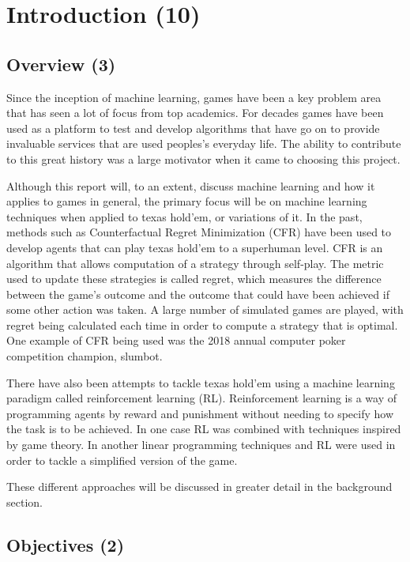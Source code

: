 \chapter{Introduction (10)}
\label{ch:intro}

\section{Overview (3)}\label{sec:overview}
Since the inception of machine learning, games have been a key problem area that has seen a lot of focus from
top academics.
For decades games have been used as a platform to test and develop algorithms that have go on to provide invaluable
services that are used peoples's everyday life.
The ability to contribute to this great history was a large motivator when it came to choosing this project.

Although this report will, to an extent, discuss machine learning and how it applies to games in general, the
primary focus will be on machine learning techniques when applied to texas hold'em, or variations of it.
In the past, methods such as Counterfactual Regret Minimization (CFR) have been used to develop agents that can
play texas hold'em to a superhuman level.
CFR is an algorithm that allows computation of a strategy through self-play.
The metric used to update these strategies is called regret, which measures the difference between the
game's outcome and the outcome that could have been achieved if some other action was taken.
A large number of simulated games are played, with regret being calculated each time in order to compute a
strategy that is optimal.
One example of CFR being used was the 2018 annual computer poker competition champion, slumbot\citep{jackson2013slumbot}.

There have also been attempts to tackle texas hold'em using a machine learning paradigm called reinforcement learning (RL).
Reinforcement learning is a way of programming agents by reward and punishment without needing to specify how the
task is to be achieved\citep{kaelbling1996reinforcement}.
In one case RL was combined with techniques inspired by game theory\citep{heinrich2016deep}.
In another linear programming techniques and RL were used in order to tackle a
simplified version of the game\citep{dahl2001reinforcement}.

These different approaches will be discussed in greater detail in the background section.

\section{Objectives (2)}\label{sec:objectives}

